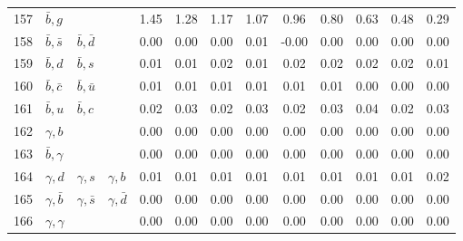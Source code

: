 \begin{tabularx}{\textwidth}{rXXX@{}S@{}S@{}S@{}S@{}S@{}S@{}S@{}S@{}S}
157 & $\bar b, g$      &                   &                  &  1.45 &  1.28 &  1.17 &  1.07 &  0.96 &  0.80 &  0.63 &  0.48 &  0.29 \\
158 & $\bar b, \bar s$ & $\bar b, \bar d$  &                  &  0.00 &  0.00 &  0.00 &  0.01 & -0.00 &  0.00 &  0.00 &  0.00 &  0.00 \\
159 & $\bar b, d$      & $\bar b, s$       &                  &  0.01 &  0.01 &  0.02 &  0.01 &  0.02 &  0.02 &  0.02 &  0.02 &  0.01 \\
160 & $\bar b, \bar c$ & $\bar b, \bar u$  &                  &  0.01 &  0.01 &  0.01 &  0.01 &  0.01 &  0.01 &  0.00 &  0.00 &  0.00 \\
161 & $\bar b, u$      & $\bar b, c$       &                  &  0.02 &  0.03 &  0.02 &  0.03 &  0.02 &  0.03 &  0.04 &  0.02 &  0.03 \\
162 & $\gamma, b$      &                   &                  &  0.00 &  0.00 &  0.00 &  0.00 &  0.00 &  0.00 &  0.00 &  0.00 &  0.00 \\
163 & $\bar b, \gamma$ &                   &                  &  0.00 &  0.00 &  0.00 &  0.00 &  0.00 &  0.00 &  0.00 &  0.00 &  0.00 \\
164 & $\gamma,  d$     & $\gamma, s$       & $\gamma, b$      &  0.01 &  0.01 &  0.01 &  0.01 &  0.01 &  0.01 &  0.01 &  0.01 &  0.02 \\
165 & $\gamma, \bar b$ & $\gamma, \bar s$  & $\gamma, \bar d$ &  0.00 &  0.00 &  0.00 &  0.00 &  0.00 &  0.00 &  0.00 &  0.00 &  0.00 \\
166 & $\gamma, \gamma$ &                   &                  &  0.00 &  0.00 &  0.00 &  0.00 &  0.00 &  0.00 &  0.00 &  0.00 &  0.00 \\
\bottomrule
\end{tabularx}
